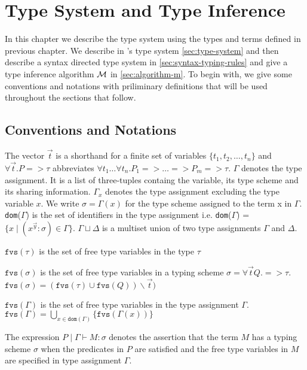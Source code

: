 \chapter{Type System and Type Inference}\label{chp:qub-type-system}
In this chapter we describe the type system using the types and terms defined in previous
chapter. We describe in \qub{}'s type system \cref{sec:type-system} and then describe a
syntax directed type system in \cref{sec:syntax-typing-rules} and give a type inference algorithm $\mathcal{M}$ in \cref{sec:algorithm-m}.
To begin with, we give some conventions and notations with priliminary definitions that will be used throughout the sections that follow.

\section{Conventions and Notations}
The vector $\vec{t}$ is a shorthand for a finite set of variables $\{t_1, t_2, \dots, t_n\}$ and  $\forall \vec{t}. P => \tau$ abbreviates
$\forall t_1 \dots \forall t_n. P_1 => \dots => P_m => \tau$.
$\Gamma$ denotes the type assignment. It is a list of three-tuples containg the variable, its type scheme and its sharing information.
$\Gamma_{x}$ denotes the type assignment excluding the type variable $x$.
We write $\sigma = \Gamma(x)$ for the type scheme assigned to the term x in $\Gamma$.
\texttt{dom}($\Gamma$) is the set of identifiers in the type assignment i.e.
\texttt{dom}($\Gamma$) = $\{ x \mid (x^{\vec{y}}:\sigma) \in \Gamma\}$.
$\Gamma \sqcup \Delta$ is a multiset union of two type assignments $\Gamma$ and $\Delta$.

\begin{defn}

  $\texttt{fvs}(\tau)$ is the set of free type variables in the type $\tau$

  \noindent$\texttt{fvs}(\sigma)$ is the set of free type variables in a typing scheme $\sigma = \forall \vec{t} Q. => \tau$.\\
  $\texttt{fvs}(\sigma) = (\texttt{fvs}(\tau) \cup \texttt{fvs}(Q)) \backslash \vec{t})$

  \noindent$\texttt{fvs}(\Gamma)$ is the set of free type variables in the type assignment $\Gamma$.\\
  $\texttt{fvs}(\Gamma) = \bigcup_{x \in \texttt{dom}(\Gamma)} \{ \texttt{fvs}(\Gamma(x)) \}$
\end{defn}

\begin{defn}
The expression $P \mid \Gamma \vdash M : \sigma$ denotes the assertion that the term $M$ has a typing scheme $\sigma$
when the predicates in $P$ are satisfied and the free type variables in $M$ are specified in type assignment $\Gamma$.
\end{defn}

